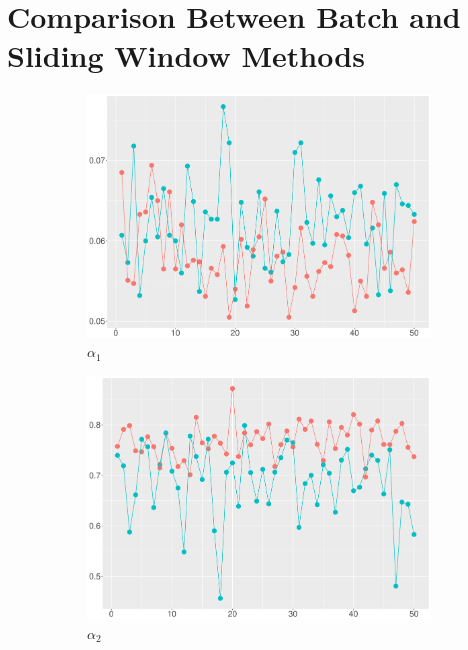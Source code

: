 \section{Comparison Between Batch and Sliding Window Methods}

\begin{figure}[h]
\centering
\begin{subfigure}[b]{0.45\textwidth}
\includegraphics[width=\textwidth]{Chapters/05MCMCOU/plots/realdatacomparea1batchwindow2.pdf}
	\caption{$\alpha_1$}
\end{subfigure}
\begin{subfigure}[b]{0.45\textwidth}
\includegraphics[width=\textwidth]{Chapters/05MCMCOU/plots/realdatacomparea2batchwindow2.pdf}
	\caption{$\alpha_2$}
\end{subfigure}
\begin{subfigure}[b]{0.45\textwidth}

\end{subfigure}
\end{figure}
